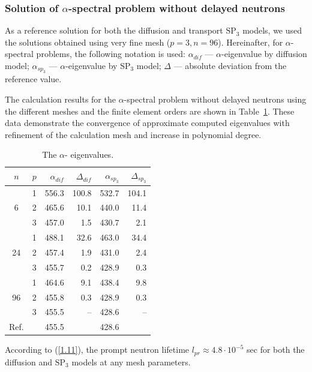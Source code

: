 \documentclass[authoryear]{elsarticle}
\begin{document}
\subsubsection{Solution of $\alpha$-spectral problem without delayed neutrons}
As a reference solution for both the diffusion and transport $\mathrm{SP_3}$ models, we used the solutions obtained using very fine mesh ($p = 3, n = 96$).
Hereinafter, for $\alpha$-spectral problems, the following notation is used: $\alpha_{dif}$ --- $\alpha$-eigenvalue by diffusion model; $\alpha_{sp_3}$ --- $\alpha$-eigenvalue by $\mathrm{SP_3}$ model; $\Delta$ --- absolute deviation from the reference value.

The calculation results for the $\alpha$-spectral problem without  delayed neutrons using the different meshes and the finite element orders are shown in Table~\ref{tab:iaea_without_alpha}.
These data demonstrate the convergence of approximate computed eigenvalues with refinement of the calculation mesh and increase in polynomial degree.

\begin{table}[h]
\caption{The $\alpha$- eigenvalues.}
\label{tab:iaea_without_alpha}
\begin{center}
\begin{tabular}{c c r r r r}
\hline
$n$ & $p$ & $\alpha_{dif}$ & $\Delta_{dif}$ &$\alpha_{sp_3}$& $\Delta_{sp_3}$ \\
\hline
	& 1	& 556.3 & 100.8 & 532.7 & 104.1\\
6	& 2	& 465.6 & 10.1 & 440.0 & 11.4\\
	& 3	& 457.0 &  1.5 & 430.7 & 2.1\\ 
\hline
	& 1	& 488.1 & 32.6 & 463.0 & 34.4\\
24& 2	& 457.4 & 1.9 & 431.0 & 2.4\\
	& 3	& 455.7 & 0.2 & 428.9 & 0.3\\ 
\hline
	& 1	& 464.6 & 9.1 & 438.4 & 9.8\\
96& 2	& 455.8 & 0.3 & 428.9 & 0.3\\
	& 3	& 455.5 & -- & 428.6 & -- \\ 
\hline
Ref.& & 455.5 & & 428.6 \\ 
\hline
\end{tabular}
\end{center}
\end{table}

According to (\ref{1.11}), the prompt neutron lifetime $l_{pr} \approx 4.8 \cdot 10^{-5}$ sec for both the diffusion and $\mathrm{SP_3}$ models at any mesh parameters.
\end{document}
